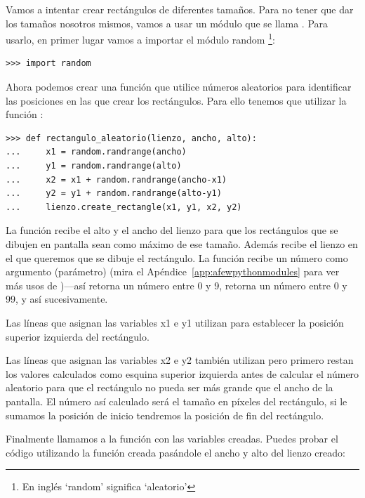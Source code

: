 Vamos a intentar crear rectángulos de diferentes tamaños.  Para no tener que dar los tamaños nosotros mismos, vamos a usar un módulo que se llama . Para usarlo, en primer lugar vamos a importar el módulo random \footnote{En inglés `random' significa `aleatorio'}:

\begin{listing}
\begin{verbatim}
>>> import random
\end{verbatim}
\end{listing}

Ahora podemos crear una función que utilice números aleatorios para identificar las posiciones en las que crear los rectángulos.  Para ello tenemos que utilizar la función :

\begin{listing}
\begin{verbatim}
>>> def rectangulo_aleatorio(lienzo, ancho, alto):
...     x1 = random.randrange(ancho)
...     y1 = random.randrange(alto)
...     x2 = x1 + random.randrange(ancho-x1)
...     y2 = y1 + random.randrange(alto-y1)
...     lienzo.create_rectangle(x1, y1, x2, y2)
\end{verbatim}
\end{listing}

La función recibe el alto y el ancho del lienzo para que los rectángulos que se dibujen en pantalla sean como máximo de ese tamaño. Además recibe el lienzo en el que queremos que se dibuje el rectángulo.  La función  recibe un número como argumento (parámetro) (mira el Apéndice~\ref{app:afewpythonmodules} para ver más usos de )---así  retorna un número entre 0 y 9,  retorna un número entre 0 y 99, y así sucesivamente. 

Las líneas que asignan las variables x1 e y1 utilizan  para establecer la posición superior izquierda del rectángulo.

Las líneas que asignan las variables x2 e y2 también utilizan  pero primero restan los valores calculados como esquina superior izquierda antes de calcular el número aleatorio para que el rectángulo no pueda ser más grande que el ancho de la pantalla. El número así calculado será el tamaño en píxeles del rectángulo, si le sumamos la posición de inicio tendremos la posición de fin del rectángulo.

Finalmente llamamos a la función  con las variables creadas.  Puedes probar el código utilizando la función creada pasándole el ancho y alto del lienzo creado:

